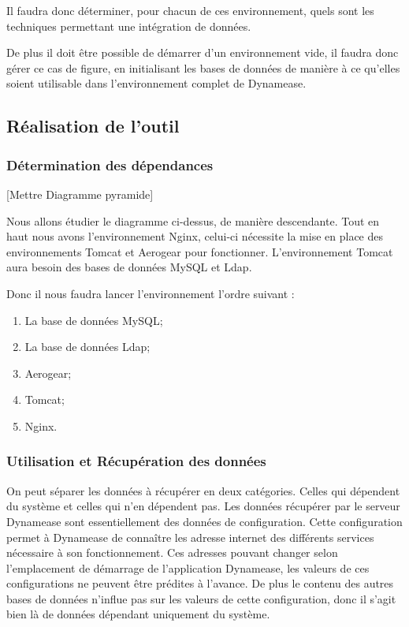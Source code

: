 Il faudra donc déterminer, pour chacun de ces environnement, quels sont les techniques permettant une intégration de données.

De plus il doit être possible de démarrer d'un environnement vide, il faudra donc gérer ce cas de figure, en initialisant les bases de données de manière à ce qu'elles soient utilisable dans l'environnement complet de Dynamease.

\subsection{Réalisation de l'outil}

\subsubsection{Détermination des dépendances}

[Mettre Diagramme pyramide]

Nous allons étudier le diagramme ci-dessus, de manière descendante. Tout en haut nous avons l'environnement Nginx, celui-ci nécessite la mise en place des environnements Tomcat et Aerogear pour fonctionner. L'environnement Tomcat aura besoin des bases de données MySQL et Ldap. 

Donc il nous faudra lancer l'environnement l'ordre suivant :

\begin{enumerate}
	\item La base de données MySQL;
	\item La base de données Ldap;
	\item Aerogear;
	\item Tomcat;
	\item Nginx.
\end{enumerate}

\subsubsection{Utilisation et Récupération des données}

On peut séparer les données à récupérer en deux catégories. Celles qui dépendent du système et celles qui n'en dépendent pas. Les données récupérer par le serveur Dynamease sont essentiellement des données de configuration. Cette configuration permet à Dynamease de connaître les adresse internet des différents services nécessaire à son fonctionnement. Ces adresses pouvant changer selon l'emplacement de démarrage de l'application Dynamease, les valeurs de ces configurations ne peuvent être prédites à l'avance. De plus le contenu des autres bases de données n'influe pas sur les valeurs de cette configuration, donc il s'agit bien là de données dépendant uniquement du système. 

